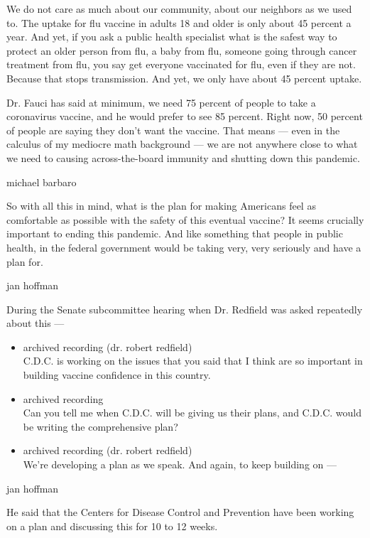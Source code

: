 We do not care as much about our community, about our neighbors as we
used to. The uptake for flu vaccine in adults 18 and older is only about
45 percent a year. And yet, if you ask a public health specialist what
is the safest way to protect an older person from flu, a baby from flu,
someone going through cancer treatment from flu, you say get everyone
vaccinated for flu, even if they are not. Because that stops
transmission. And yet, we only have about 45 percent uptake.

Dr. Fauci has said at minimum, we need 75 percent of people to take a
coronavirus vaccine, and he would prefer to see 85 percent. Right now,
50 percent of people are saying they don't want the vaccine. That means
--- even in the calculus of my mediocre math background --- we are not
anywhere close to what we need to causing across-the-board immunity and
shutting down this pandemic.

michael barbaro

So with all this in mind, what is the plan for making Americans feel as
comfortable as possible with the safety of this eventual vaccine? It
seems crucially important to ending this pandemic. And like something
that people in public health, in the federal government would be taking
very, very seriously and have a plan for.

jan hoffman

During the Senate subcommittee hearing when Dr. Redfield was asked
repeatedly about this ---

\begin{itemize}
\item
  archived recording (dr. robert redfield)\\
  C.D.C. is working on the issues that you said that I think are so
  important in building vaccine confidence in this country.
\item
  archived recording\\
  Can you tell me when C.D.C. will be giving us their plans, and C.D.C.
  would be writing the comprehensive plan?
\item
  archived recording (dr. robert redfield)\\
  We're developing a plan as we speak. And again, to keep building on
  ---
\end{itemize}

jan hoffman

He said that the Centers for Disease Control and Prevention have been
working on a plan and discussing this for 10 to 12 weeks.

